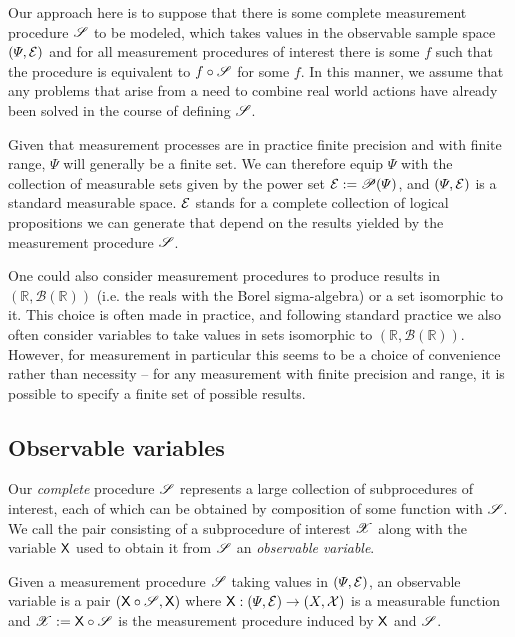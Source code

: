 Our approach here is to suppose that there is some complete measurement procedure $\mathscr{S}$ to be modeled, which takes values in the observable sample space $(\Psi,\mathcal{E})$ and for all measurement procedures of interest there is some $f$ such that the procedure is equivalent to $f\circ \mathscr{S}$ for some $f$. In this manner, we assume that any problems that arise from a need to combine real world actions have already been solved in the course of defining $\mathscr{S}$.

Given that measurement processes are in practice finite precision and with finite range, $\Psi$ will generally be a finite set. We can therefore equip $\Psi$ with the collection of measurable sets given by the power set $\mathcal{E}:=\mathscr{P}(\Psi)$, and $(\Psi,\mathcal{E})$ is a standard measurable space. $\mathcal{E}$ stands for a complete collection of logical propositions we can generate that depend on the results yielded by the measurement procedure $\mathscr{S}$.

One could also consider measurement procedures to produce results in $(\mathbb{R},\mathcal{B}(\mathbb{R}))$ (i.e. the reals with the Borel sigma-algebra) or a set isomorphic to it. This choice is often made in practice, and following standard practice we also often consider variables to take values in sets isomorphic to $(\mathbb{R},\mathcal{B}(\mathbb{R}))$. However, for measurement in particular this seems to be a choice of convenience rather than necessity -- for any measurement with finite precision and range, it is possible to specify a finite set of possible results.

\subsection{Observable variables}

Our \emph{complete} procedure $\mathscr{S}$ represents a large collection of subprocedures of interest, each of which can be obtained by composition of some function with $\mathscr{S}$. We call the pair consisting of a subprocedure of interest $\mathscr{X}$ along with the variable $\mathsf{X}$ used to obtain it from $\mathscr{S}$ an \emph{observable variable}.

\begin{definition}
Given a measurement procedure $\mathscr{S}$ taking values in $(\Psi,\mathcal{E})$, an observable variable is a pair $(\mathsf{X}\circ \mathscr{S},\mathsf{X})$ where $\mathsf{X}:(\Psi,\mathcal{E})\to (X,\mathcal{X})$ is a measurable function and $\mathscr{X}:=\mathsf{X}\circ \mathscr{S}$ is the measurement procedure induced by $\mathsf{X}$ and $\mathscr{S}$.
\end{definition}

